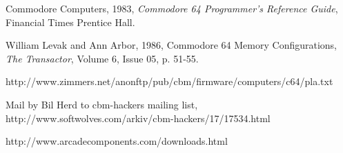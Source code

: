 \documentclass[a4paper,oneside]{memoir}
\begin{document}
\begin{thebibliography}{999}

 Commodore Computers, 1983, \textit{Commodore 64
Programmer's Reference Guide}, Financial Times Prentice Hall.

 William Levak and Ann Arbor, 1986, Commodore 64 Memory
Configurations, \textit{The Transactor}, Volume 6, Issue 05, p. 51-55.

http://www.zimmers.net/anonftp/pub/cbm/firmware/computers/c64/pla.txt

 Mail by Bil Herd to cbm-hackers mailing list,
http://www.softwolves.com/arkiv/cbm-hackers/17/17534.html

 http://www.arcadecomponents.com/downloads.html

\end{thebibliography}
\end{document}
